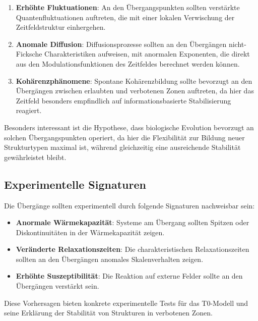 \documentclass[12pt,a4paper]{article}
\begin{document}
	\begin{enumerate}
		\item \textbf{Erhöhte Fluktuationen}: An den Übergangspunkten sollten verstärkte Quantenfluktuationen auftreten, die mit einer lokalen \glqq Verwischung\grqq{} der Zeitfeldstruktur einhergehen.
		
		\item \textbf{Anomale Diffusion}: Diffusionsprozesse sollten an den Übergängen nicht-Ficksche Charakteristiken aufweisen, mit anormalen Exponenten, die direkt aus den Modulationsfunktionen des Zeitfeldes berechnet werden können.
		
		\item \textbf{Kohärenzphänomene}: Spontane Kohärenzbildung sollte bevorzugt an den Übergängen zwischen erlaubten und verbotenen Zonen auftreten, da hier das Zeitfeld besonders empfindlich auf informationsbasierte Stabilisierung reagiert.
	\end{enumerate}
	
	Besonders interessant ist die Hypothese, dass biologische Evolution bevorzugt an solchen Übergangspunkten operiert, da hier die Flexibilität zur Bildung neuer Strukturtypen maximal ist, während gleichzeitig eine ausreichende Stabilität gewährleistet bleibt.
	
	\subsection{Experimentelle Signaturen}
	\label{subsec:experimentelle_signaturen}
	
	Die Übergänge sollten experimentell durch folgende Signaturen nachweisbar sein:
	
	\begin{itemize}
		\item \textbf{Anormale Wärmekapazität}: Systeme am Übergang sollten Spitzen oder Diskontinuitäten in der Wärmekapazität zeigen.
		
		\item \textbf{Veränderte Relaxationszeiten}: Die charakteristischen Relaxationszeiten sollten an den Übergängen anomales Skalenverhalten zeigen.
		
		\item \textbf{Erhöhte Suszeptibilität}: Die Reaktion auf externe Felder sollte an den Übergängen verstärkt sein.
	\end{itemize}
	
	Diese Vorhersagen bieten konkrete experimentelle Tests für das T0-Modell und seine Erklärung der Stabilität von Strukturen in verbotenen Zonen.
	
\end{document}
